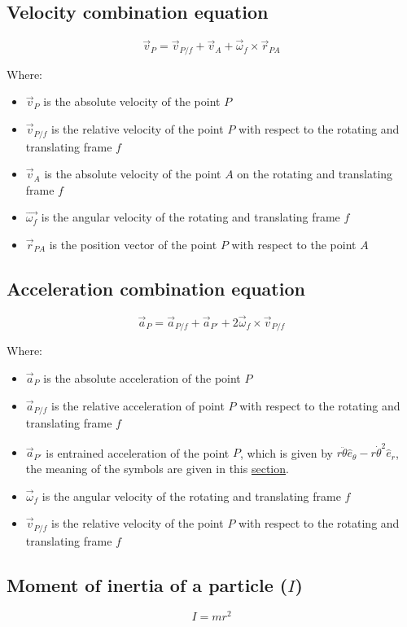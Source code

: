 \documentclass[11pt]{article}
\begin{document}
\subsection{Velocity combination equation}
\label{sec:org2ce7ea3}
\[\vec{v}_P = \vec{v}_{P/f} + \vec{v}_A + \vec{\omega}_f \times \vec{r}_{PA}\]

Where:
\begin{itemize}
\item \(\vec{v}_P\) is the absolute velocity of the point \(P\)
\item \(\vec{v}_{P/f}\) is the relative velocity of the point \(P\) with respect to the rotating and translating frame \(f\)
\item \(\vec{v}_A\) is the absolute velocity of the point \(A\) on the rotating and translating frame \(f\)
\item \(\vec{\omega_f}\) is the angular velocity of the rotating and translating frame \(f\)
\item \(\vec{r}_{PA}\) is the position vector of the point \(P\) with respect to the point \(A\)
\end{itemize}

 \newpage
\subsection{Acceleration combination equation}
\label{sec:orgf1b6963}
\[\vec{a}_P = \vec{a}_{P/f} + \vec{a}_{P'} + 2 \vec{\omega}_f \times \vec{v}_{P/f}\]

Where:
\begin{itemize}
\item \(\vec{a}_P\) is the absolute acceleration of the point \(P\)
\item \(\vec{a}_{P/f}\) is the relative acceleration of point \(P\) with respect to the rotating and translating frame \(f\)
\item \(\vec{a}_{P'}\) is entrained acceleration of the point \(P\), which is given by \(r \ddot{\theta} \hat{e}_{\theta} - r \dot{\theta}^2 \hat{e}_r\), the meaning of the symbols are given in this \hyperref[orgcf8331e]{section}.
\item \(\vec{\omega}_f\) is the angular velocity of the rotating and translating frame \(f\)
\item \(\vec{v}_{P/f}\) is the relative velocity of the point \(P\) with respect to the rotating and translating frame \(f\)
\end{itemize}
\subsection{Moment of inertia of a particle (\(I\))}
\label{sec:org7b9134e}
\[I = mr^2\]
\end{document}
